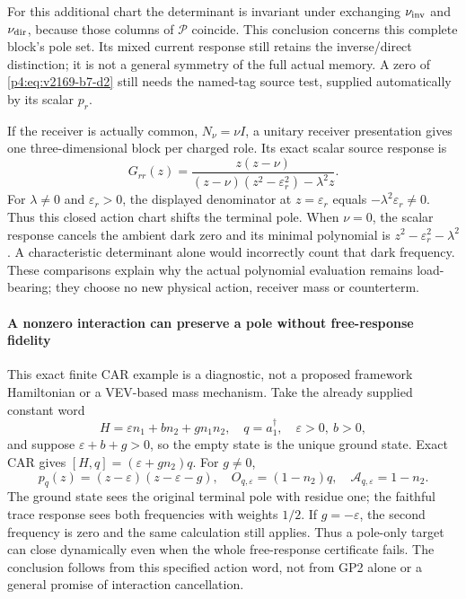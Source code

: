 \documentclass[12pt,a4paper]{article}
\begin{document}
For this additional chart the determinant is invariant under exchanging
$\nu_{\rm inv}$ and $\nu_{\rm dir}$, because those columns of $\mathcal P$
coincide. This conclusion concerns this complete block's pole set. Its mixed
current response still retains the inverse/direct distinction; it is not a
general symmetry of the full actual memory. A zero of \eqref{p4:eq:v2169-b7-d2} still needs the
named-tag source test, supplied automatically by its scalar $p_r$.

If the receiver is actually common, $N_\nu=\nu I$, a unitary receiver
presentation gives one three-dimensional block per charged role. Its exact
scalar source response is
\begin{equation}
 G_{rr}(z)=\frac{z(z-\nu)}{
 (z-\nu)(z^2-\varepsilon_r^2)-\lambda^2z}.
 \label{p4:eq:v2169-b7-d3}
\end{equation}
For $\lambda\ne0$ and $\varepsilon_r>0$, the displayed denominator at
$z=\varepsilon_r$ equals $-\lambda^2\varepsilon_r\ne0$. Thus this
closed action chart shifts the terminal pole. When $\nu=0$, the scalar
response cancels the ambient dark zero and its minimal polynomial is
$z^2-\varepsilon_r^2-\lambda^2$. A characteristic determinant alone would
incorrectly count that dark frequency. These comparisons explain why the
actual polynomial evaluation remains load-bearing; they choose no new
physical action, receiver mass or counterterm.



\paragraph{A nonzero interaction can preserve a pole without free-response fidelity}
This exact finite CAR example is a diagnostic, not a proposed framework
Hamiltonian or a VEV-based mass mechanism. Take the already supplied constant
word
\[
 H=\varepsilon n_1+b n_2+g n_1n_2,\quad q=a_1^\dagger,
 \quad\varepsilon>0,\ b>0,
\]
and suppose $\varepsilon+b+g>0$, so the empty state is the unique ground
state. Exact CAR gives $[H,q]=(\varepsilon+g n_2)q$. For $g\ne0$,
\begin{equation}
 p_q(z)=(z-\varepsilon)(z-\varepsilon-g),\quad
 O_{q,\varepsilon}=(1-n_2)q,\quad
 \mathcal A_{q,\varepsilon}=1-n_2.
 \label{p4:eq:v2169-b7-d4}
\end{equation}
The ground state sees the original terminal pole with residue one;
the faithful trace response sees both frequencies with weights $1/2$.
If $g=-\varepsilon$, the second frequency is zero and the same calculation
still applies. Thus a pole-only target can close dynamically even when the
whole free-response certificate fails. The conclusion follows from this
specified action word, not from GP2 alone or a general promise of interaction
cancellation.
\end{document}
